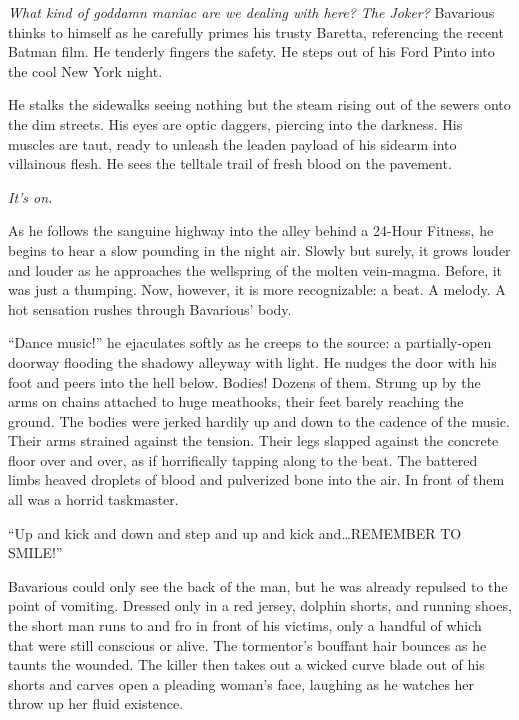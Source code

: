 {\em What kind of goddamn maniac are we dealing with here? The
Joker?} Bavarious thinks to himself as he carefully primes his
trusty Baretta, referencing the recent Batman film. He tenderly
fingers the safety. He steps out of his Ford Pinto into the cool
New York night.



He stalks the sidewalks seeing nothing but the steam rising out of
the sewers onto the dim streets. His eyes are optic daggers,
piercing into the darkness. His muscles are taut, ready to unleash
the leaden payload of his sidearm into villainous flesh. He sees
the telltale trail of fresh blood on the pavement.



{\em It's on.}



As he follows the sanguine highway into the alley behind a 24-Hour
Fitness, he begins to hear a slow pounding in the night air. Slowly
but surely, it grows louder and louder as he approaches the
wellspring of the molten vein-magma. Before, it was just a
thumping. Now, however, it is more recognizable: a beat. A melody.
A hot sensation rushes through Bavarious' body.



``Dance music!'' he ejaculates softly as he creeps to the
source: a partially-open doorway flooding the shadowy alleyway with
light. He nudges the door with his foot and peers into the hell
below. Bodies! Dozens of them. Strung up by the arms on chains
attached to huge meathooks, their feet barely reaching the ground.
The bodies were jerked hardily up and down to the cadence of the
music. Their arms strained against the tension. Their legs slapped
against the concrete floor over and over, as if horrifically
tapping along to the beat. The battered limbs heaved droplets of
blood and pulverized bone into the air. In front of them all was a
horrid taskmaster.



``Up and kick and down and step and up and kick
and{\ldots}REMEMBER TO SMILE!''



Bavarious could only see the back of the man, but he was already
repulsed to the point of vomiting. Dressed only in a red jersey,
dolphin shorts, and running shoes, the short man runs to and fro in
front of his victims, only a handful of which that were still
conscious or alive. The tormentor's bouffant hair bounces as
he taunts the wounded. The killer then takes out a wicked curve
blade out of his shorts and carves open a pleading woman's
face, laughing as he watches her throw up her fluid
existence.



